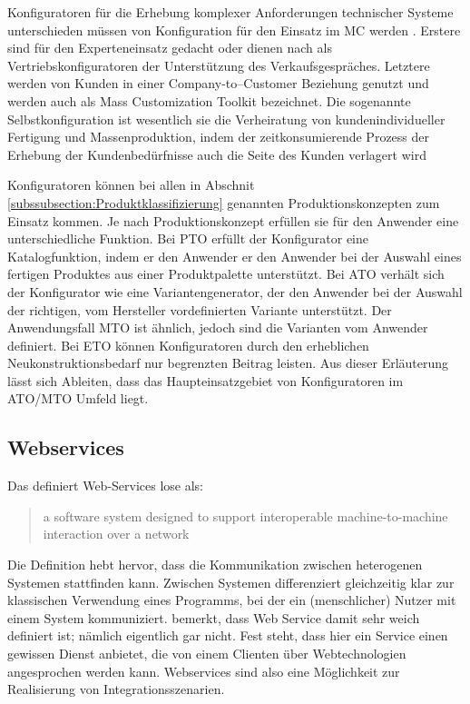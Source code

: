 \documentclass[12pt,a4paper,bibliography=totocnumbered,listof=totoc]{scrartcl}
\begin{document}
Konfiguratoren für die Erhebung komplexer Anforderungen technischer Systeme unterschieden müssen von Konfiguration für den Einsatz im \ac{MC} werden \citep{felferning14}. Erstere sind für den Experteneinsatz gedacht oder dienen nach \citet{piller06} als Vertriebskonfiguratoren der Unterstützung des Verkaufsgespräches.   Letztere werden von Kunden in einer Company-to–Customer Beziehung genutzt und werden auch als Mass Customization Toolkit bezeichnet. Die sogenannte Selbstkonfiguration ist wesentlich sie die Verheiratung von kundenindividueller Fertigung und Massenproduktion, indem der zeitkonsumierende Prozess der Erhebung der Kundenbedürfnisse auch die Seite des Kunden verlagert wird\citep{piller06}

Konfiguratoren können bei allen in Abschnit \ref{subssubsection:Produktklassifizierung} genannten Produktionskonzepten zum Einsatz kommen. Je nach Produktionskonzept erfüllen sie für den Anwender eine unterschiedliche Funktion. Bei \ac{PTO} erfüllt der Konfigurator eine Katalogfunktion, indem er den Anwender er den Anwender bei der Auswahl eines fertigen Produktes aus einer Produktpalette unterstützt. Bei \ac{ATO} verhält sich der Konfigurator wie eine Variantengenerator, der den Anwender bei der Auswahl der richtigen, vom Hersteller vordefinierten Variante unterstützt. Der Anwendungsfall \ac{MTO} ist ähnlich, jedoch sind die Varianten vom Anwender definiert. Bei \ac{ETO} können Konfiguratoren durch den erheblichen Neukonstruktionsbedarf nur begrenzten Beitrag leisten. Aus dieser Erläuterung lässt sich Ableiten, dass das Haupteinsatzgebiet von Konfiguratoren im \ac{ATO}/\ac{MTO} Umfeld liegt.

\subsection{Webservices}

Das \citet	{w3c04} definiert Web-Services lose als:

\begin{quote}
\glqq [...] a software system designed to support interoperable machine-to-machine interaction over a network\grqq
\end{quote}

Die Definition hebt hervor, dass die Kommunikation zwischen heterogenen Systemen stattfinden kann. \glqq Zwischen Systemen\grqq{} differenziert gleichzeitig klar zur klassischen Verwendung eines Programms, bei der ein (menschlicher) Nutzer mit einem System kommuniziert. \citet{tilkov11} bemerkt, dass Web Service damit sehr weich definiert ist; \glqq nämlich eigentlich gar nicht\grqq{}. Fest steht, dass hier ein Service einen gewissen Dienst anbietet, die von einem Clienten über Webtechnologien angesprochen werden kann. Webservices sind also eine Möglichkeit zur Realisierung von Integrationsszenarien.
\end{document}
